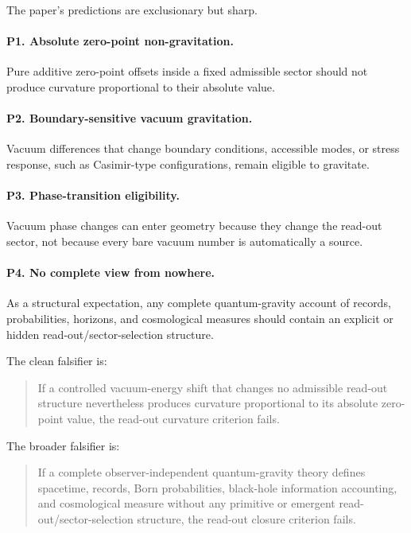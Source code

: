\documentclass[12pt,a4paper]{article}
\theoremstyle{definition}
\theoremstyle{remark}
\begin{document}
The paper's predictions are exclusionary but sharp.

\paragraph{P1. Absolute zero-point non-gravitation.}
Pure additive zero-point offsets inside a fixed admissible sector should not produce curvature proportional to their absolute value.

\paragraph{P2. Boundary-sensitive vacuum gravitation.}
Vacuum differences that change boundary conditions, accessible modes, or stress response, such as Casimir-type configurations, remain eligible to gravitate.

\paragraph{P3. Phase-transition eligibility.}
Vacuum phase changes can enter geometry because they change the read-out sector, not because every bare vacuum number is automatically a source.

\paragraph{P4. No complete view from nowhere.}
As a structural expectation, any complete quantum-gravity account of records, probabilities, horizons, and cosmological measures should contain an explicit or hidden read-out/sector-selection structure.

The clean falsifier is:

\begin{quote}
If a controlled vacuum-energy shift that changes no admissible read-out structure nevertheless produces curvature proportional to its absolute zero-point value, the read-out curvature criterion fails.
\end{quote}

The broader falsifier is:

\begin{quote}
If a complete observer-independent quantum-gravity theory defines spacetime, records, Born probabilities, black-hole information accounting, and cosmological measure without any primitive or emergent read-out/sector-selection structure, the read-out closure criterion fails.
\end{quote}
\end{document}
